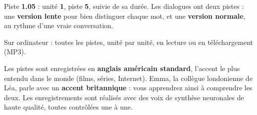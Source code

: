 \begin{paire}
\begin{tcolorbox}[otBase,colback=white,colframe=otRule,boxrule=0.5pt]
\begin{center}\end{center}
{\fontsize{10}{12.6}\selectfont Piste \textbf{1.05} : unité \textbf{1}, piste \textbf{5}, suivie de sa durée.
Les dialogues ont deux pistes : une \textbf{version lente} pour bien distinguer chaque mot, et une
\textbf{version normale}, au rythme d'une vraie conversation.\par}
\end{tcolorbox}
\begin{tcolorbox}[otBase,colback=otNavyTint,colframe=otNavyTint,halign=center]
%
{\otSemi\fontsize{7}{8.5}\selectfont\color{otNavy}}\par\vspace{2mm}
{\color{otInk}\otQR{25mm}{}}\par\vspace{2mm}
{\otMedium\fontsize{9.4}{11.4}\selectfont\otAudioAffiche}\par\vspace{1mm}
{\fontsize{9.2}{11.4}\selectfont\color{otMuted}Sur ordinateur : toutes les pistes, unité par unité, en lecture ou en téléchargement (MP3).\par}
\end{tcolorbox}
\end{paire}

Les pistes sont enregistrées en \textbf{anglais américain standard}, l'accent le plus entendu dans
le monde (films, séries, Internet). Emma, la collègue londonienne de Léa, parle avec un
\textbf{accent britannique} : vous apprendrez ainsi à comprendre les deux. Les enregistrements sont
réalisés avec des voix de synthèse neuronales de haute qualité, toutes contrôlées une à une.

\begin{tcbraster}[raster columns=3,raster equal height=rows,raster column skip=3.5mm,raster before skip=1mm]
\end{tcbraster}
